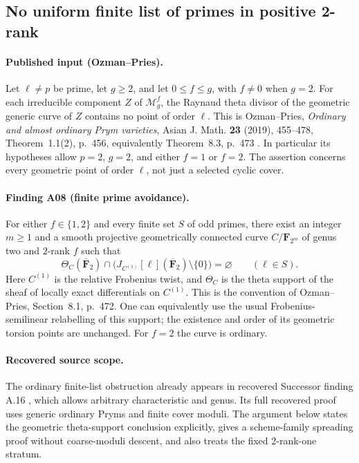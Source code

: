 \subsection{No uniform finite list of primes in positive 2-rank}
\label{sec:finite-prime-avoidance}

\paragraph{Published input (Ozman--Pries).}
Let $\ell\ne p$ be prime, let $g\ge2$, and let $0\le f\le g$, with
$f\ne0$ when $g=2$.  For each irreducible component $Z$ of
$\mathcal M_g^f$, the Raynaud theta divisor of the geometric generic
curve of $Z$ contains no point of order $\ell$.  This is
Ozman--Pries, \emph{Ordinary and almost ordinary Prym varieties},
Asian J. Math. \textbf{23} (2019), 455--478,
Theorem~1.1(2), p.~456, equivalently Theorem~8.3, p.~473 \cite{OzmanPries2019}.
In particular its hypotheses allow $p=2$, $g=2$, and either $f=1$ or
$f=2$.  The assertion concerns every geometric point of order $\ell$,
not just a selected cyclic cover.

\paragraph{Finding A08 (finite prime avoidance).}
For either $f\in\{1,2\}$ and every finite set $S$ of odd primes, there
exist an integer $m\ge1$ and a smooth projective geometrically connected
curve $C/\mathbf F_{2^m}$ of genus two and $2$-rank $f$ such that
\[
 \Theta_C(\overline{\mathbf F}_2)\cap
 \bigl(J_{C^{(1)}}[\ell](\overline{\mathbf F}_2)\setminus\{0\}\bigr)
 =\varnothing\qquad(\ell\in S).
 \tag{FP.1}
\]
Here $C^{(1)}$ is the relative Frobenius twist, and $\Theta_C$ is the
theta support of the sheaf of locally exact differentials on $C^{(1)}$.
This is the convention of Ozman--Pries, Section~8.1, p.~472.
One can equivalently use the usual Frobenius-semilinear relabelling of
this support; the existence and order of its geometric torsion points
are unchanged.  For $f=2$ the curve is ordinary.

\paragraph{Recovered source scope.}
The ordinary finite-list obstruction already appears in recovered
Successor finding A.16 \cite[A.16]{ASrun}, which allows arbitrary
characteristic and genus.  Its full recovered proof uses generic
ordinary Pryms and finite cover moduli.  The argument below states the
geometric theta-support conclusion explicitly, gives a scheme-family
spreading proof without coarse-moduli descent, and also treats the
fixed $2$-rank-one stratum.


